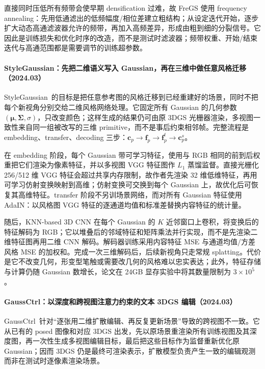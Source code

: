 直接同时压低所有频带会使早期 densification 过难，故 FreGS 使用 frequency annealing：先用低通滤出的低频幅度/相位差建立粗结构；从设定迭代开始，逐步扩大动态高通滤波器允许的频带，再加入高频差异，形成由粗到细的分裂信号。它因此是训练损失和优化时序的改造，而不是测试时滤波器；频带权重、开始/结束迭代与高通范围都是需要调节的训练超参数。

\paragraph{StyleGaussian：先把二维语义写入 Gaussian，再在三维中做任意风格迁移（2024.03）}
StyleGaussian~\cite{2403_07807}的目标是把任意参考图的风格迁移到已经重建好的场景，同时不把每个新视角分别交给二维风格网络处理。它固定所有 Gaussian 的几何参数 $\left(\boldsymbol\mu,\boldsymbol\Sigma,\sigma\right)$，只改变颜色；这样生成的结果仍可由原 3DGS 光栅器渲染，多视图一致性来自同一组被改写的三维 primitive，而不是事后约束相邻帧。完整流程是 embedding、transfer、decoding 三步：$\mathbf c_p\!\rightarrow\!\mathbf f_p\!\rightarrow\!\mathbf f_p^t\!\rightarrow\!\mathbf c_p^s$。

在 embedding 阶段，每个 Gaussian 带可学习特征，使用与 RGB 相同的前到后权重把它们渲染为像素特征，并以多视图 VGG 特征图作 $L_1$ 蒸馏监督。直接光栅化 256/512 维 VGG 特征会超过共享内存限制，故作者先渲染 32 维低维特征，再用可学习仿射变换映射到高维；仿射变换可交换到每个 Gaussian 上，故优化后可恢复其高维特征。transfer 阶段不另训场景网络，而对所有 Gaussian 特征使用 AdaIN：以风格图 VGG 特征的逐通道均值和标准差替换内容特征的统计量。

随后，KNN-based 3D CNN 在每个 Gaussian 的 $K$ 近邻窗口上卷积，将变换后的特征解码为 RGB；它以堆叠后的邻域特征和矩阵乘法并行实现，而不是先渲染二维特征图再用二维 CNN 解码。解码器训练采用内容特征 MSE 与通道均值/方差风格 MSE 的加权和。完成一次三维解码后，后续新视角只走常规 splatting。代价是它不改变几何，形变型笔触或需要改几何的风格难以忠实表达；此外，特征存储与计算仍随 Gaussian 数增长，论文在 24GB 显存实验中将其数量限制为 $3\times10^5$。


\paragraph{GaussCtrl：以深度和跨视图注意力约束的文本 3DGS 编辑（2024.03）}
GaussCtrl~\cite{2403_08733}针对“逐张用二维扩散编辑、再反复更新场景”导致的跨视图不一致。它从已有的 posed 图像和对应 3DGS 出发，先以原场景重渲染所有训练视图及其深度图，再一次性生成多视图编辑目标，最后把这些目标作为监督重新优化原 Gaussian；因而 3DGS 仍是最终可渲染表示，扩散模型负责产生一致的编辑观测而非在测试时逐像素渲染场景。

